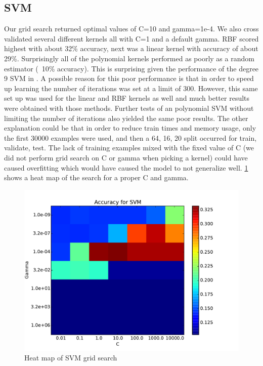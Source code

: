 \documentclass[conference]{IEEEtran}
\begin{document}
\subsection{SVM}
Our grid search returned optimal values of C=10 and gamma=1e-4. We also cross validated several different kernels all with C=1 and a default gamma. RBF scored highest with about 32\% accuracy, next was a linear kernel with accuracy of about 29\%. Surprisingly all of the polynomial kernels performed as poorly as a random estimator (~10\% accuracy). This is surprising given the performance of the degree 9 SVM in \cite{LeCunn98}. A possible reason for this poor performance is that in order to speed up learning the number of iterations was set at a limit of 300. However, this same set up was used for the linear and RBF kernels as well and much better results were obtained with those methods. Further tests of an polynomial SVM without limiting the number of iterations also yielded the same poor results. The other explanation could be that in order to reduce train times and memory usage, only the first 30000 examples were used, and then a 64, 16, 20 split occurred for train, validate, test. The lack of training examples mixed with the fixed value of C (we did not perform grid search on C or gamma when picking a kernel) could have caused overfitting which would have caused the model to not generalize well. \ref{SVMGrid} shows a heat map of the search for a proper C and gamma. 

\begin{figure}[h]
	\centering
	\includegraphics[scale=0.4]{SVM_grid_search.pdf}
	\caption{Heat map of SVM grid search}
	\label{SVMGrid}
\end{figure}
\end{document}
